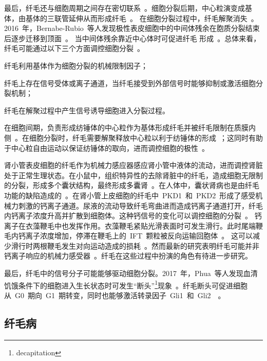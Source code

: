 最后，纤毛还与细胞周期之间存在密切联系\ \citep{Phua2017}。细胞分裂后期，中心粒演变成基体，由基体的三联管延伸从而形成纤毛\ \citep{Wood2012}。 在细胞分裂过程中，纤毛解聚消失\ \citep{Phua2017}。2016\ 年，Bernabe-Rubio\ 等人发现极性表皮细胞中的中间体残余在胞质分裂结束后逐步迁移到顶面\ \citep{Bernabe-Rubio2016}。 当中间体残余靠近中心体时可促进纤毛
形成\ \citep{Bernabe-Rubio2016}。总体来看，纤毛可能通过以下三个方面调控细胞分裂\ \citep{Quarmby2005,Plotnikova2009,Jackson2011}。
\begin{asparaenum}[(1)]
\item 纤毛利用基体作为细胞分裂的机械限制因子；
\item 纤毛上存在信号受体或离子通道，当纤毛接受到外部信号时能够抑制或激活细胞分裂机制；
\item 纤毛在解聚过程中产生信号诱导细胞进入分裂过程。
\end{asparaenum}

在细胞间期，负责形成纺锤体的中心粒作为基体形成纤毛并被纤毛限制在质膜内侧\ \citep{Pan2007}。在细胞分裂时，纤毛需要解聚释放中心粒以利于纺锤体的形成\ \citep{Wood2012,Pan2007}；这同时有助于中心粒自由运动以保证纺锤体的取向，进而调控细胞的极性\ \citep{Pan2007}。

肾小管表皮细胞的纤毛作为机械力感应器感应肾小管中液体的流动，进而调控肾脏处于正常生理状态。在小鼠中，组织特异性的去除肾脏中的纤毛，造成细胞无限制的分裂，形成多个囊状结构，最终形成多囊肾\ \citep{Watnick2003}。在人体中，囊状肾病也是由纤毛功能的缺陷造成的\ \citep{Kim2014a}。在肾小管上皮细胞的纤毛中\ PKD1\ 和\ PKD2\ 形成了感受机械力刺激的钙离子通道。尿液的流动导致纤毛弯曲进而造成钙离子通道打开，纤毛内钙离子浓度升高并扩散到细胞体。这种钙信号的变化可以调控细胞的分裂\ \citep{Nauli2003}。 钙离子在衣藻鞭毛中也发挥作用。衣藻鞭毛紧贴光滑表面时可发生滑行。此时尾端鞭毛内钙离子浓度增加，停滞在鞭毛上的\ IFT\ 颗粒被反向运输回胞体\ \citep{Collingridge2013}。 这可以减少滑行时两根鞭毛发生对向运动造成的损耗\ \citep{Collingridge2013}。然而最新的研究表明纤毛可能并非钙离子响应的机械力感受器\
\citep{Delling2016}。纤毛在这些过程中扮演的角色有待进一步研究。

最后，纤毛中的信号分子可能能够驱动细胞分裂。2017\ 年，Phua\ 等人发现血清饥饿条件下的细胞进入生长状态时可发生“断头”\footnote{decapitation}现象\ \citep{Phua2017}。纤毛断头可促进细胞从\ G0\ 期向\ G1\ 期转变，同时也能够激活转录因子\ Gli1\ 和\ Gli2\ \ \citep{Phua2017}。

\subsection{纤毛病}

